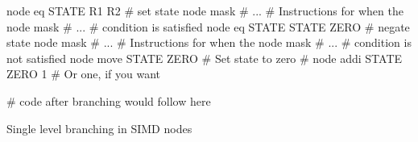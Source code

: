 \begin{listing}[h]
  \centering
  \begin{lenacode}
    node eq STATE R1 R2      # set state 
      node mask # ... # Instructions for when the
      node mask # ... # condition is satisfied
    node eq STATE STATE ZERO # negate state
      node mask # ... # Instructions for when the
      node mask # ... # condition is not satisfied
    node move STATE ZERO     # Set state to zero
    # node addi STATE ZERO 1 # Or one, if you want

    # code after branching would follow here
  \end{lenacode}
  \caption[Single level branching]{Single level branching in SIMD nodes}
  \label{lst:single-level-branching}
\end{listing}
